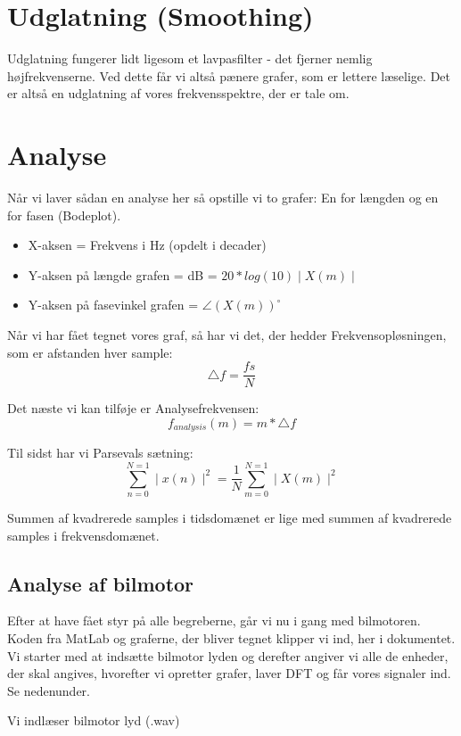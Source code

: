 \documentclass[12pt, letterpaper]{article}
\begin{document}
\section{Udglatning (Smoothing)}
Udglatning fungerer lidt ligesom et lavpasfilter - det fjerner nemlig højfrekvenserne. 
Ved dette får vi altså pænere grafer, som er lettere læselige. Det er altså en udglatning af vores frekvensspektre, der er tale om. 

\section{Analyse}

Når vi laver sådan en analyse her så opstille vi to grafer: 
En for længden og en for fasen (Bodeplot). \\

\begin{itemize}
\item X-aksen = Frekvens i Hz (opdelt i decader)
\item Y-aksen på længde grafen = dB = $ 20*log(10)\mid X(m) \mid$ 
\item Y-aksen på fasevinkel grafen = $\angle (X(m))^{\circ}  $
\end{itemize}

Når vi har fået tegnet vores graf, så har vi det, der hedder Frekvensopløsningen, som er afstanden hver sample: 
$$\bigtriangleup f = \frac{fs}{N} $$

Det næste vi kan tilføje er Analysefrekvensen: 
$$f_{analysis}(m)=m*\bigtriangleup f$$

Til sidst har vi Parsevals sætning: 
$$ \sum\limits_{n=0}^{N=1} \mid x(n) \mid^2 = \frac{1}{N} \sum\limits_{m=0}^{N=1} \mid X(m) \mid^2    $$

Summen af kvadrerede samples i tidsdomænet er lige med summen af kvadrerede samples i frekvensdomænet.


\subsection{Analyse af bilmotor}
Efter at have fået styr på alle begreberne, går vi nu i gang med bilmotoren. Koden fra MatLab og graferne, der bliver tegnet klipper vi ind, her i dokumentet. 
Vi starter med at indsætte bilmotor lyden og derefter angiver vi alle de enheder, der skal angives, hvorefter vi opretter grafer, laver DFT og får vores signaler ind. Se nedenunder. 

Vi indlæser bilmotor lyd (.wav)
\end{document}
